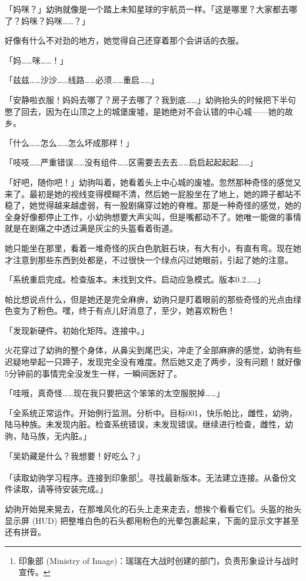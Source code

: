 「妈咪？」幼驹就像是一个踏上未知星球的宇航员一样。「这是哪里？大家都去哪了？妈咪？妈咪……？」

好像有什么不对劲的地方，她觉得自己还穿着那个会讲话的衣服。

「妈……咪……！」

「{\mt 兹兹……沙沙……线路……必须……重启……}」

「安静啦衣服！妈妈去哪了？房子去哪了？我到底……」幼驹抬头的时候把下半句憋了回去，因为在山顶之上的城堡废墟，是她绝对不会认错的中心城——她的故乡。

「什么……怎么……怎么坏成那样！」

「{\mt 吱吱……严重错误……没有组件……区需要去去去……启启起起起起……}」

「好吧，随你吧！」幼驹叫着，她看着头上中心城的废墟。忽然那种奇怪的感觉又来了。最初是她的视线变得模糊不清，然后她一屁股坐在了地上，她的蹄子都站不稳了，她觉得越来越虚弱，有一股剧痛穿过她的脊椎。那是一种奇怪的感觉，她的全身好像都停止工作，小幼驹想要大声尖叫，但是嘴都动不了。她唯一能做的事情就是在剧痛之中透过满是灰尘的头盔看着街道。

她只能坐在那里，看着一堆奇怪的灰白色肮脏石块，有大有小，有直有弯。现在她才注意到那些东西到处都是，不过很快一个绿点闪过她眼前，引起了她的注意。

「{\mt 系统重启完成。检查版本。未找到文件。启动应急模式。版本0.2……}」

帕比想说点什么，但是她还是完全麻痹，幼驹只是盯着眼前的那些奇怪的光点由绿色变为了粉色。嘿，终于有点儿好消息了，至少，她喜欢粉色！

「{\mt 发现新硬件。初始化矩阵。连接中。}」

火花穿过了幼驹的整个身体，从鼻尖到尾巴尖，冲走了全部麻痹的感觉，幼驹有些迟疑地举起一只蹄子，发现完全没有难度。然后她又走了两步，没有问题！就好像5分钟前的事情完全没发生一样，一瞬间医好了。

「哇哦，真奇怪……现在我只要把这个笨笨的太空服脱掉……」

「{\mt 全系统正常运作。开始例行监测。分析中。目标001，快乐帕比，雌性，幼驹，陆马种族。未发现内脏。检查系统错误，未发现错误。继续进行检查，雌性，幼驹，陆马族，无内脏。}」

「吴奶藏是什么？我想要！好吃么？」

「{\mt 读取幼驹学习程序。连接到印象部\footnote{印象部 (Ministry of Image)：瑞瑞在大战时创建的部门，负责形象设计与战时宣传。}。寻找最新版本。无法建立连接。从备份文件读取，请等待安装完成。}」

幼驹开始晃来晃去，在那堆风化的石头上走来走去，想挨个看看它们。头盔的抬头显示屏 (HUD) 把整堆白色的石头都用粉色的光晕包裹起来，下面的显示文字甚至还有拼音。

